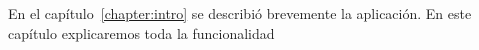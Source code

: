 
En el capítulo~\ref{chapter:intro} se describió brevemente la aplicación. En este capítulo explicaremos toda la funcionalidad 


